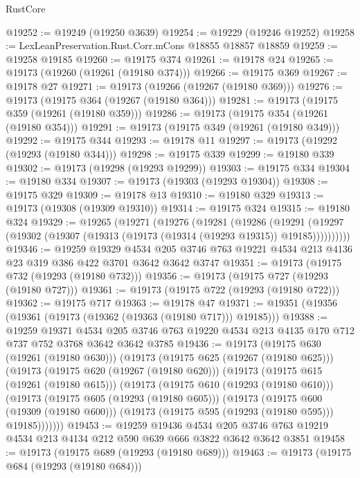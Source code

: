 \begin{lexlean}{RustCore}
\begin{coremodule}
@19252 := @19249 (@19250 @3639)
@19254 := @19229 (@19246 @19252)
@19258 := LexLeanPreservation.Rust.Corr.mCons @18855 @18857 @18859
@19259 := @19258 @19185
@19260 := @19175 @374
@19261 := @19178 @24
@19265 := @19173 (@19260 (@19261 (@19180 @374)))
@19266 := @19175 @369
@19267 := @19178 @27
@19271 := @19173 (@19266 (@19267 (@19180 @369)))
@19276 := @19173 (@19175 @364 (@19267 (@19180 @364)))
@19281 := @19173 (@19175 @359 (@19261 (@19180 @359)))
@19286 := @19173 (@19175 @354 (@19261 (@19180 @354)))
@19291 := @19173 (@19175 @349 (@19261 (@19180 @349)))
@19292 := @19175 @344
@19293 := @19178 @11
@19297 := @19173 (@19292 (@19293 (@19180 @344)))
@19298 := @19175 @339
@19299 := @19180 @339
@19302 := @19173 (@19298 (@19293 @19299))
@19303 := @19175 @334
@19304 := @19180 @334
@19307 := @19173 (@19303 (@19293 @19304))
@19308 := @19175 @329
@19309 := @19178 @13
@19310 := @19180 @329
@19313 := @19173 (@19308 (@19309 @19310))
@19314 := @19175 @324
@19315 := @19180 @324
@19329 := @19265
    (@19271
      (@19276
        (@19281
          (@19286
            (@19291
              (@19297 (@19302 (@19307 (@19313 (@19173 (@19314 (@19293 @19315)) @19185))))))))))
@19346 := @19259
    @19329
    @4534
    @205
    @3746
    @763
    @19221
    @4534
    @213
    @4136
    @23
    @319
    @386
    @422
    @3701
    @3642
    @3642
    @3747
@19351 := @19173 (@19175 @732 (@19293 (@19180 @732)))
@19356 := @19173 (@19175 @727 (@19293 (@19180 @727)))
@19361 := @19173 (@19175 @722 (@19293 (@19180 @722)))
@19362 := @19175 @717
@19363 := @19178 @47
@19371 := @19351 (@19356 (@19361 (@19173 (@19362 (@19363 (@19180 @717))) @19185)))
@19388 := @19259
    @19371
    @4534
    @205
    @3746
    @763
    @19220
    @4534
    @213
    @4135
    @170
    @712
    @737
    @752
    @3768
    @3642
    @3642
    @3785
@19436 := @19173
    (@19175 @630 (@19261 (@19180 @630)))
    (@19173
      (@19175 @625 (@19267 (@19180 @625)))
      (@19173
        (@19175 @620 (@19267 (@19180 @620)))
        (@19173
          (@19175 @615 (@19261 (@19180 @615)))
          (@19173
            (@19175 @610 (@19293 (@19180 @610)))
            (@19173
              (@19175 @605 (@19293 (@19180 @605)))
              (@19173
                (@19175 @600 (@19309 (@19180 @600)))
                (@19173 (@19175 @595 (@19293 (@19180 @595))) @19185)))))))
@19453 := @19259
    @19436
    @4534
    @205
    @3746
    @763
    @19219
    @4534
    @213
    @4134
    @212
    @590
    @639
    @666
    @3822
    @3642
    @3642
    @3851
@19458 := @19173 (@19175 @689 (@19293 (@19180 @689)))
@19463 := @19173 (@19175 @684 (@19293 (@19180 @684)))

\end{coremodule}
\end{lexlean}
